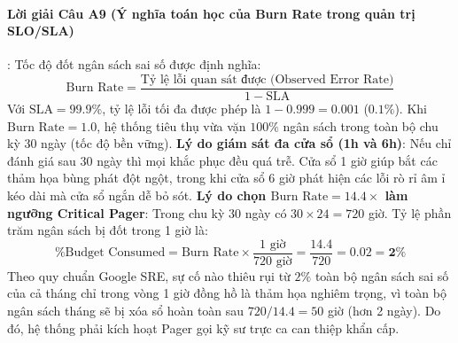 \paragraph{Lời giải Câu A9 (Ý nghĩa toán học của Burn Rate trong quản trị SLO/SLA)}:
Tốc độ đốt ngân sách sai số được định nghĩa:
\begin{equation*}
\text{Burn Rate} = \frac{\text{Tỷ lệ lỗi quan sát được (Observed Error Rate)}}{1 - \text{SLA}}
\end{equation*}
Với $\text{SLA} = 99.9\%$, tỷ lệ lỗi tối đa được phép là $1 - 0.999 = 0.001$ ($0.1\%$).
Khi $\text{Burn Rate} = 1.0$, hệ thống tiêu thụ vừa vặn $100\%$ ngân sách trong toàn bộ chu kỳ 30 ngày (tốc độ bền vững).
\textbf{Lý do giám sát đa cửa sổ (1h và 6h)}: Nếu chỉ đánh giá sau 30 ngày thì mọi khắc phục đều quá trễ. Cửa sổ 1 giờ giúp bắt các thảm họa bùng phát đột ngột, trong khi cửa sổ 6 giờ phát hiện các lỗi rò rỉ âm ỉ kéo dài mà cửa sổ ngắn dễ bỏ sót.
\textbf{Lý do chọn $\text{Burn Rate} = 14.4\times$ làm ngưỡng Critical Pager}:
Trong chu kỳ 30 ngày có $30 \times 24 = 720$ giờ. Tỷ lệ phần trăm ngân sách bị đốt trong 1 giờ là:
\begin{equation*}
\% \text{Budget Consumed} = \text{Burn Rate} \times \frac{1\text{ giờ}}{720\text{ giờ}} = \frac{14.4}{720} = 0.02 = \mathbf{2\%}
\end{equation*}
Theo quy chuẩn Google SRE, sự cố nào thiêu rụi từ $2\%$ toàn bộ ngân sách sai số của cả tháng chỉ trong vòng 1 giờ đồng hồ là thảm họa nghiêm trọng, vì toàn bộ ngân sách tháng sẽ bị xóa sổ hoàn toàn sau $720 / 14.4 = 50$ giờ (hơn 2 ngày). Do đó, hệ thống phải kích hoạt Pager gọi kỹ sư trực ca can thiệp khẩn cấp.

